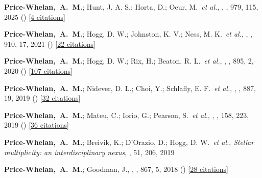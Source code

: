 \item[{\color{deemph}\scriptsize20}]\textbf{Price-Whelan,~A.~M.}; Hunt, J. A. S.; Horta, D.; Oeur, M.~\textit{et al.}, , \apj, 979, 115, 2025 () [\href{http://adsabs.harvard.edu/abs/2025ApJ...979..115P}{4 citations}]

\item[{\color{deemph}\scriptsize19}]\textbf{Price-Whelan,~A.~M.}; Hogg, D. W.; Johnston, K. V.; Ness, M. K.~\textit{et al.}, , \apj, 910, 17, 2021 () [\href{http://adsabs.harvard.edu/abs/2021ApJ...910...17P}{22 citations}]

\item[{\color{deemph}\scriptsize18}]\textbf{Price-Whelan,~A.~M.}; Hogg, D. W.; Rix, H.; Beaton, R. L.~\textit{et al.}, , \apj, 895, 2, 2020 () [\href{http://adsabs.harvard.edu/abs/2020ApJ...895....2P}{107 citations}]

\item[{\color{deemph}\scriptsize17}]\textbf{Price-Whelan,~A.~M.}; Nidever, D. L.; Choi, Y.; Schlafly, E. F.~\textit{et al.}, , \apj, 887, 19, 2019 () [\href{http://adsabs.harvard.edu/abs/2019ApJ...887...19P}{32 citations}]

\item[{\color{deemph}\scriptsize16}]\textbf{Price-Whelan,~A.~M.}; Mateu, C.; Iorio, G.; Pearson, S.~\textit{et al.}, , \aj, 158, 223, 2019 () [\href{http://adsabs.harvard.edu/abs/2019AJ....158..223P}{36 citations}]

\item[{\color{deemph}\scriptsize15}]\textbf{Price-Whelan,~A.~M.}; Breivik, K.; D'Orazio, D.; Hogg, D. W.~\textit{et al.}, \textit{Stellar multiplicity: an interdisciplinary nexus}, \baas, 51, 206, 2019

\item[{\color{deemph}\scriptsize14}]\textbf{Price-Whelan,~A.~M.}; Goodman, J., , \apj, 867, 5, 2018 () [\href{http://adsabs.harvard.edu/abs/2018ApJ...867....5P}{28 citations}]

